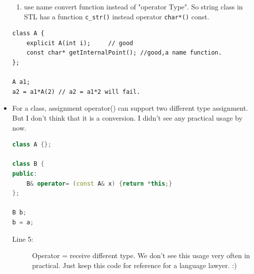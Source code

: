 \documentclass[a4paper,11pt,twoside]{book}
\begin{document}
\begin{itemize}
\begin{enumerate}
		\item use name convert function instead of  "operator Type". So string class in STL has a function \texttt{c\_str()} instead operator \texttt{char*()} const. 
	\end{enumerate}
\begin{lstlisting}[numbers=none]
class A {
	explicit A(int i);     // good
	const char* getInternalPoint(); //good,a name function.
};	

A a1;
a2 = a1*A(2) // a2 = a1*2 will fail. 
\end{lstlisting}	
	
	\item For a class, assignment operator() can support two different type assignment. But I don't think that it is a conversion. I didn't see any practical usage by now. 
\begin{lstlisting}[frame=single, language=c++]
class A {};
	
class B {
public:
	B& operator= (const A& x) {return *this;}
};
	
B b;
b = a; 
\end{lstlisting}
\begin{description}
	\item[Line 5:] Operator = receive different type. We don't see this usage very often in practical. Just keep this code for reference for a language lawyer. :) 
\end{description}
\end{itemize}
\end{document}
